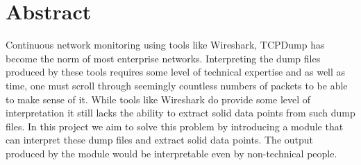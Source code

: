 \chapter{Abstract}
{
	Continuous network monitoring using tools like Wireshark, TCPDump has become the norm of most enterprise networks. Interpreting the dump files produced by these tools requires some level of technical expertise and as well as time, one must scroll through seemingly countless numbers of packets to be able to make sense of it. While tools like Wireshark do provide some level of interpretation it still lacks the ability to extract solid data points from such dump files. In this project we aim to solve this problem by introducing a module that can interpret these dump files and extract solid data points. The output produced by the module would be interpretable even by non-technical people.
}
